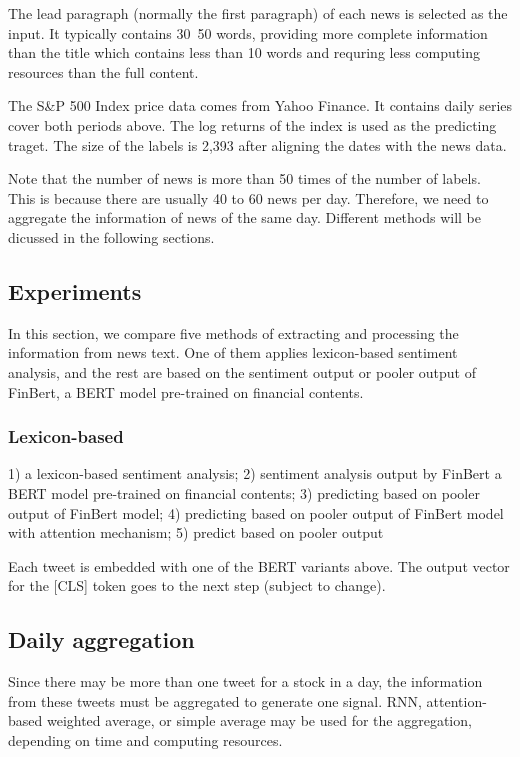 \documentclass[11pt]{article}
\begin{document}
The lead paragraph (normally the first paragraph) of each news is selected as the input. It typically contains 30~50 words, providing more complete information than the title which contains less than 10 words and requring less computing resources than the full content.

The S&P 500 Index price data comes from Yahoo Finance. It contains daily series cover both periods above. The log returns of the index is used as the predicting traget. The size of the labels is 2,393 after aligning the dates with the news data. 

Note that the number of news is more than 50 times of the number of labels. This is because there are usually 40 to 60 news per day. Therefore, we need to aggregate the information of news of the same day. Different methods will be dicussed in the following sections. 

\subsection{Experiments}

In this section, we compare five methods of extracting and processing the information from news text. One of them applies lexicon-based sentiment analysis, and the rest are based on the sentiment output or pooler output of FinBert, a BERT model pre-trained on financial contents.

\subsubsection{Lexicon-based}


1) a lexicon-based sentiment analysis; 2) sentiment analysis output by FinBert a BERT model pre-trained on financial contents; 3) predicting based on pooler output of FinBert model; 4) predicting based on pooler output of FinBert model with attention mechanism; 5) predict based on pooler output 

Each tweet is embedded with one of the BERT variants above. The output vector for the [CLS] token goes to the next step (subject to change).

\subsection{Daily aggregation}
Since there may be more than one tweet for a stock in a day, the information from these tweets must be aggregated to generate one signal. RNN, attention-based weighted average, or simple average may be used for the aggregation, depending on time and computing resources. 
\end{document}
